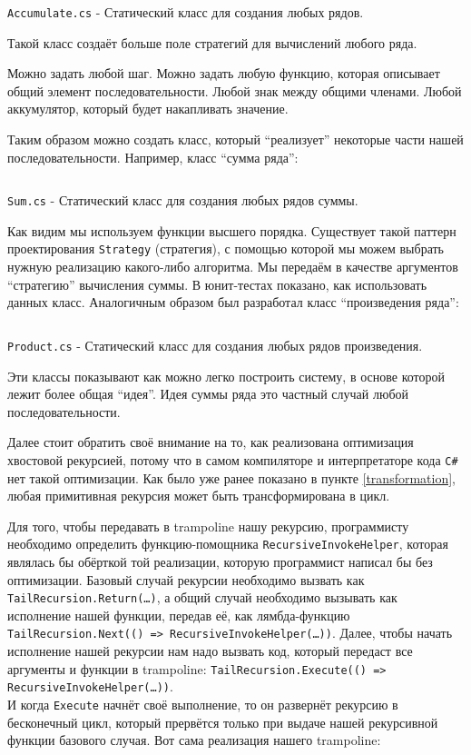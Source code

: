 \begin{code}
	\inputminted[tabsize=2,breaklines]{csharp}{src/Library/Accumulate.cs}
	\caption{\texttt{Accumulate.cs} - Статический класс для создания любых рядов.}
\end{code}

Такой класс создаёт больше поле стратегий для вычислений любого ряда.

Можно задать любой шаг. Можно задать любую функцию, которая описывает общий элемент последовательности. Любой знак между общими членами. Любой аккумулятор, который будет накапливать значение.

Таким образом можно создать класс, который ``реализует'' некоторые части нашей последовательности. Например, класс ``сумма ряда'':

\begin{code}
	\inputminted[tabsize=2,breaklines]{csharp}{src/Library/Sum.cs}
	\caption{\texttt{Sum.cs} - Статический класс для создания любых рядов суммы.}
\end{code}

Как видим мы используем функции высшего порядка. 
Существует такой паттерн проектирования \texttt{Strategy} (стратегия), с помощью которой мы можем выбрать нужную реализацию какого-либо алгоритма.
Мы передаём в качестве аргументов ``стратегию'' вычисления суммы.
В юнит-тестах показано, как использовать данных класс.
Аналогичным образом был разработал класс ``произведения ряда'':

\begin{code}
	\inputminted[tabsize=2,breaklines]{csharp}{src/Library/Product.cs}
	\caption{\texttt{Product.cs} - Статический класс для создания любых рядов произведения.}
\end{code}

Эти классы показывают как можно легко построить систему, в основе которой лежит более общая ``идея''.
Идея суммы ряда это частный случай любой последовательности.

Далее стоит обратить своё внимание на то, как реализована оптимизация хвостовой рекурсией, потому что в самом компиляторе и интерпретаторе кода \texttt{C\#} нет такой оптимизации.
Как было уже ранее показано в пункте \ref{transformation}, любая примитивная рекурсия может быть трансформирована в цикл.

Для того, чтобы передавать в trampoline нашу рекурсию, программисту необходимо определить функцию-помощника \texttt{RecursiveInvokeHelper}, которая являлась бы обёрткой той реализации, которую программист написал бы без оптимизации. 
Базовый случай рекурсии необходимо вызвать как \texttt{TailRecursion.Return(\dots)}, а общий случай необходимо вызывать как исполнение нашей функции, передав её, как лямбда-функцию \\ \texttt{TailRecursion.Next(() => RecursiveInvokeHelper(\dots))}. 
Далее, чтобы начать исполнение нашей рекурсии нам надо вызвать код, который передаст все аргументы и функции в trampoline: \texttt{TailRecursion.Execute(() => RecursiveInvokeHelper(\dots))}. \\ И когда \texttt{Execute} начнёт своё выполнение, то он развернёт рекурсию в бесконечный цикл, который прервётся только при выдаче нашей рекурсивной функции базового случая. 
Вот сама реализация нашего trampoline:


